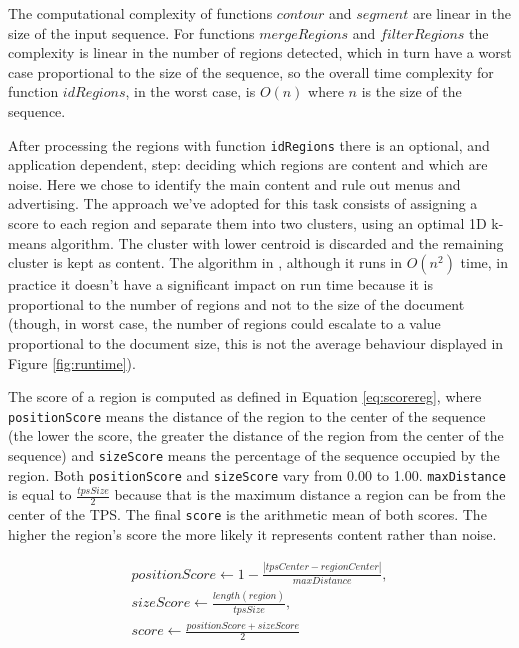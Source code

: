 The computational complexity of functions $contour$ and $segment$ are linear in
the size of the input sequence. For functions $mergeRegions$ and $filterRegions$
the complexity is linear in the number of regions detected, which in turn have a
worst case proportional to the size of the sequence, so the overall time
complexity for function $idRegions$, in the worst case, is $O(n)$ where $n$ is
the size of the sequence.

After processing the regions with function \texttt{idRegions} there is an
optional, and application dependent, step: deciding which regions are content
and which are noise. Here we chose to identify the main content and rule out
menus and advertising. The approach we've adopted for this task consists of
assigning a score to each region and separate them into two clusters, using an
optimal 1D k-means algorithm\cite{1dkmeans2011}. The cluster with lower centroid
is discarded and the remaining cluster is kept as content. The algorithm in
\cite{1dkmeans2011}, although it runs in $O(n^2)$ time, in practice it doesn't
have a significant impact on run time because it is proportional to the number
of regions and not to the size of the document (though, in worst case, the
number of regions could escalate to a value proportional to the document size,
this is not the average behaviour displayed in Figure \ref{fig:runtime}).

The score of a region is computed as defined in Equation \ref{eq:scorereg},
where \texttt{positionScore} means the distance of the region to the center of
the sequence (the lower the score, the greater the distance of the region from
the center of the sequence) and \texttt{sizeScore} means the percentage of the
sequence occupied by the region. Both \texttt{positionScore} and
\texttt{sizeScore} vary from 0.00 to 1.00. \texttt{maxDistance} is equal to
$\frac{tpsSize}{2}$ because that is the maximum distance a region can be from
the center of the TPS. The final \texttt{score} is the arithmetic mean of both
scores. The higher the region's score the more likely it represents content
rather than noise.

\vspace{-0.3cm}

\begin{small}
\begin{equation}\label{eq:scorereg}
\begin{split}
positionScore \leftarrow 1-\frac{|tpsCenter - regionCenter|}{maxDistance}, \\
sizeScore \leftarrow \frac{length(region)}{tpsSize},\\
score \leftarrow \frac{positionScore+sizeScore}{2}
\end{split}
\end{equation}
\end{small}


